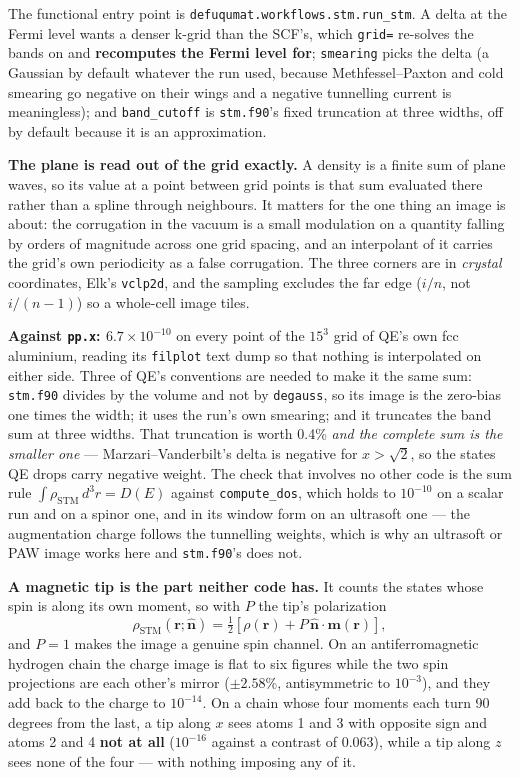 \documentclass[11pt,a4paper]{article}
\newcommand{\code}[1]{\texttt{\small #1}}
\begin{document}
The functional entry point is \code{defuqumat.workflows.stm.run\_stm}. A delta at
the Fermi level wants a denser k-grid than the SCF's, which \code{grid=}
re-solves the bands on and \textbf{recomputes the Fermi level for}; \code{smearing}
picks the delta (a Gaussian by default whatever the run used, because
Methfessel--Paxton and cold smearing go negative on their wings and a negative
tunnelling current is meaningless); and \code{band\_cutoff} is \code{stm.f90}'s
fixed truncation at three widths, off by default because it is an approximation.

\textbf{The plane is read out of the grid exactly.} A density is a finite sum
of plane waves, so its value at a point between grid points is that sum
evaluated there rather than a spline through neighbours. It matters for the one
thing an image is about: the corrugation in the vacuum is a small modulation on
a quantity falling by orders of magnitude across one grid spacing, and an
interpolant of it carries the grid's own periodicity as a false corrugation.
The three corners are in \emph{crystal} coordinates, Elk's \code{vclp2d}, and
the sampling excludes the far edge ($i/n$, not $i/(n-1)$) so a whole-cell image
tiles.

\textbf{Against \code{pp.x}: $6.7\times10^{-10}$} on every point of the
$15^3$ grid of QE's own fcc aluminium, reading its \code{filplot} text dump so
that nothing is interpolated on either side. Three of QE's conventions are
needed to make it the same sum: \code{stm.f90} divides by the volume and not by
\code{degauss}, so its image is the zero-bias one times the width; it uses the
run's own smearing; and it truncates the band sum at three widths. That
truncation is worth 0.4\% \emph{and the complete sum is the smaller one} ---
Marzari--Vanderbilt's delta is negative for $x > \sqrt2$, so the states QE drops
carry negative weight. The check that involves no other code is the sum rule
$\int\rho_{\mathrm{STM}}\,d^3r = D(E)$ against \code{compute\_dos}, which holds
to $10^{-10}$ on a scalar run and on a spinor one, and in its window form on an
ultrasoft one --- the augmentation charge follows the tunnelling weights, which
is why an ultrasoft or PAW image works here and \code{stm.f90}'s does not.

\textbf{A magnetic tip is the part neither code has.} It counts the states
whose spin is along its own moment, so with $P$ the tip's polarization
\begin{equation*}
  \rho_{\mathrm{STM}}(\mathbf r; \hat{\mathbf n})
   = \tfrac12\left[\rho(\mathbf r)
     + P\,\hat{\mathbf n}\cdot\mathbf m(\mathbf r)\right],
\end{equation*}
and $P = 1$ makes the image a genuine spin channel. On an antiferromagnetic
hydrogen chain the charge image is flat to six figures while the two spin
projections are each other's mirror ($\pm 2.58\%$, antisymmetric to $10^{-3}$),
and they add back to the charge to $10^{-14}$. On a chain whose four moments
each turn 90 degrees from the last, a tip along $x$ sees atoms 1 and 3 with
opposite sign and atoms 2 and 4 \textbf{not at all} ($10^{-16}$ against a
contrast of 0.063), while a tip along $z$ sees none of the four --- with nothing
imposing any of it.
\end{document}
